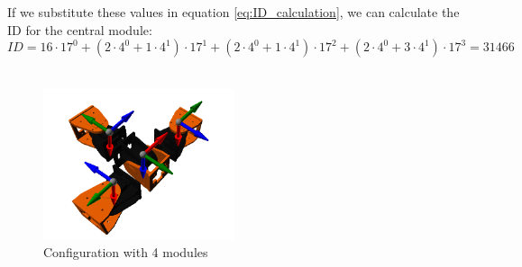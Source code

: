 If we substitute these values in equation \ref{eq:ID_calculation}, we can calculate the ID for the central module:
\[ID =16 \cdot 17^0 +
 ( 2 \cdot 4^0+ 1 \cdot 4^1) \cdot 17^1 +
 ( 2 \cdot 4^0+ 1 \cdot 4^1) \cdot 17^2 +
 ( 2 \cdot 4^0+ 3 \cdot 4^1)  \cdot 17^3 = 31466\]\\
  
\begin{figure}[h]
		\centering
        \includegraphics[width=0.5\textwidth]{images/Conf_example_09-01.png}
        \caption{Configuration with 4 modules}\label{fig:config_example9}
\end{figure}

\newpage